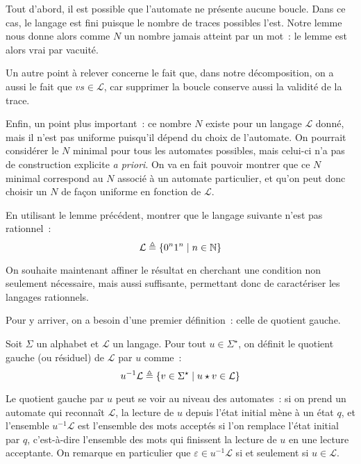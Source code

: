 \begin{remark}
  Tout d'abord, il est possible que l'automate ne présente aucune boucle. Dans
  ce cas, le langage est fini puisque le nombre de traces possibles l'est. Notre
  lemme nous donne alors comme $N$ un nombre jamais atteint par un mot~: le
  lemme est alors vrai par vacuité.

  Un autre point à relever concerne le fait que, dans notre décomposition, on a
  aussi le fait que $vs \in \mathcal L$, car supprimer la boucle conserve aussi
  la validité de la trace.

  Enfin, un point plus important~: ce nombre $N$ existe pour un langage
  $\mathcal L$ donné, mais il n'est pas uniforme puisqu'il dépend du choix de
  l'automate. On pourrait considérer le $N$ minimal pour tous les automates
  possibles, mais celui-ci n'a pas de construction explicite \textit{a priori}.
  On va en fait pouvoir montrer que ce $N$ minimal correspond au $N$ associé à
  un automate particulier, et qu'on peut donc choisir un $N$ de façon uniforme
  en fonction de $\mathcal L$.
\end{remark}

\begin{exercise}
  En utilisant le lemme précédent, montrer que le langage suivante n'est pas
  rationnel~:
  \[\mathcal L \triangleq \{0^n1^n\mid n \in \mathbb N\}\]
\end{exercise}

On souhaite maintenant affiner le résultat en cherchant une condition non
seulement nécessaire, mais aussi suffisante, permettant donc de caractériser les
langages rationnels.

Pour y arriver, on a besoin d'une premier définition~: celle de quotient gauche.

\begin{definition}
  Soit $\Sigma$ un alphabet et $\mathcal L$ un langage. Pour tout
  $u \in \Sigma^\star$, on définit le quotient gauche (ou résiduel) de
  $\mathcal L$ par $u$ comme~:
  \[u^{-1}\mathcal L\triangleq \{v \in \Sigma^\star\mid u\star v \in \mathcal L\}\]
\end{definition}

Le quotient gauche par $u$ peut se voir au niveau des automates~: si on prend
un automate qui reconnaît $\mathcal L$, la lecture de $u$ depuis l'état
initial mène à un état $q$, et l'ensemble $u^{-1}\mathcal L$ est l'ensemble des
mots acceptés si l'on remplace l'état initial par $q$, c'est-à-dire l'ensemble
des mots qui finissent la lecture de $u$ en une lecture acceptante. On remarque
en particulier que $\varepsilon \in u^{-1}\mathcal L$ si et seulement si
$u \in \mathcal L$.

